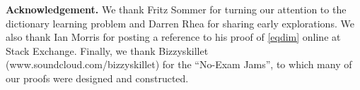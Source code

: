 \documentclass[journal, twocolumn]{IEEEtran}
\begin{document}

\textbf{Acknowledgement.} We thank Fritz Sommer for turning our attention to the dictionary learning problem and Darren Rhea for sharing early explorations. We also thank Ian Morris for posting a reference to his proof of \eqref{eqdim} online at Stack Exchange. Finally, we thank Bizzyskillet (www.soundcloud.com/bizzyskillet) for the ``No-Exam Jams'', to which many of our proofs were designed and constructed.

%
\end{document}
